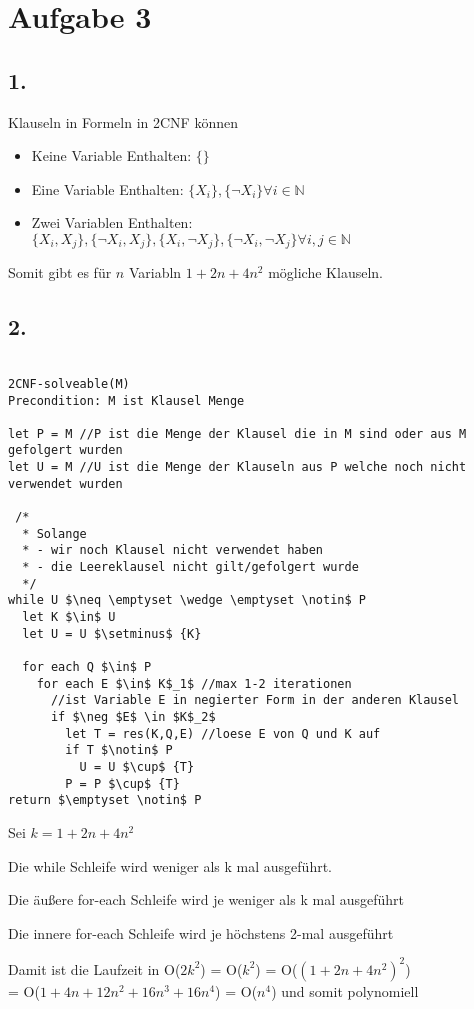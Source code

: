 \section*{Aufgabe 3}

\subsection*{1.}

Klauseln in Formeln in 2CNF können
\begin{itemize}
\item Keine Variable  Enthalten: $\{\}$
\item Eine  Variable  Enthalten: $\{X_i\},\{\neg X_i\} \forall i \in \mathbb{N}$
\item Zwei  Variablen Enthalten:\\
$\{X_i,X_j\},\{\neg X_i,X_j\},\{X_i,\neg X_j\},\{\neg X_i,\neg X_j\} \forall i,j \in \mathbb{N}$ 
\end{itemize}

Somit gibt es für $n$ Variabln $1+2n+4n^2$ mögliche Klauseln.

\subsection*{2.}


\begin{lstlisting}

2CNF-solveable(M)
Precondition: M ist Klausel Menge

let P = M //P ist die Menge der Klausel die in M sind oder aus M gefolgert wurden
let U = M //U ist die Menge der Klauseln aus P welche noch nicht verwendet wurden
 
 /*
  * Solange 
  * - wir noch Klausel nicht verwendet haben 
  * - die Leereklausel nicht gilt/gefolgert wurde
  */ 
while U $\neq \emptyset \wedge \emptyset \notin$ P
  let K $\in$ U
  let U = U $\setminus$ {K}
  
  for each Q $\in$ P
    for each E $\in$ K$_1$ //max 1-2 iterationen
      //ist Variable E in negierter Form in der anderen Klausel
      if $\neg $E$ \in $K$_2$ 
        let T = res(K,Q,E) //loese E von Q und K auf
        if T $\notin$ P
          U = U $\cup$ {T}
        P = P $\cup$ {T}
return $\emptyset \notin$ P

\end{lstlisting}

Sei $k = 1+2n+4n^2$

Die while Schleife wird weniger als k mal ausgeführt.

Die äußere for-each Schleife wird je weniger als k mal ausgeführt

Die innere for-each Schleife wird je höchstens 2-mal ausgeführt

Damit ist die Laufzeit in O($2k^2$) = O($k^2$) = O($(1+2n+4n^2)^2$)\\ = O($1+4n+12n^2+16n^3+16n^4$) = O($n^4$) und somit polynomiell

